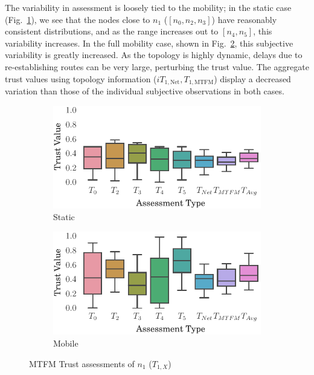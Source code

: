 \documentclass[conference]{IEEEtran}
\begin{document}
The variability in assessment is loosely tied to the mobility; in the static case (Fig.~\ref{fig:trust_static}), we see that the nodes close to $n_1$ ($[n_0,n_2,n_3]$) have reasonably consistent distributions, and as the range increases out to $[n_4,n_5]$, this variability increases.
In the full mobility case, shown in Fig.~\ref{fig:trust_all_mobile}, this subjective variability is greatly increased. 
As the topology is highly dynamic, delays due to re-establishing routes can be very large, perturbing the trust value.
The aggregate trust values using topology information ($iT_{1,\text{Net}},T_{1,\text{MTFM}}$) display a decreased variation than those of the individual subjective observations in both cases.
%
\begin{figure}[h]
\begin{subfigure}{.5\textwidth}
  \centering
  \includegraphics[width=\linewidth]{img/trust_bella_static.pdf}
  \caption{Static}
  \label{fig:trust_static}
\end{subfigure}%
\begin{subfigure}{.5\textwidth}
\centering
  \includegraphics[width=\linewidth]{img/trust_bella_all_mobile.pdf}
  \caption{Mobile}
  \label{fig:trust_all_mobile}
\end{subfigure}
\caption{MTFM Trust assessments of $n_1$ ($T_{1,X}$)\protect\footnotemark}
\label{fig:trust_mobility}
\end{figure}
%
\end{document}
